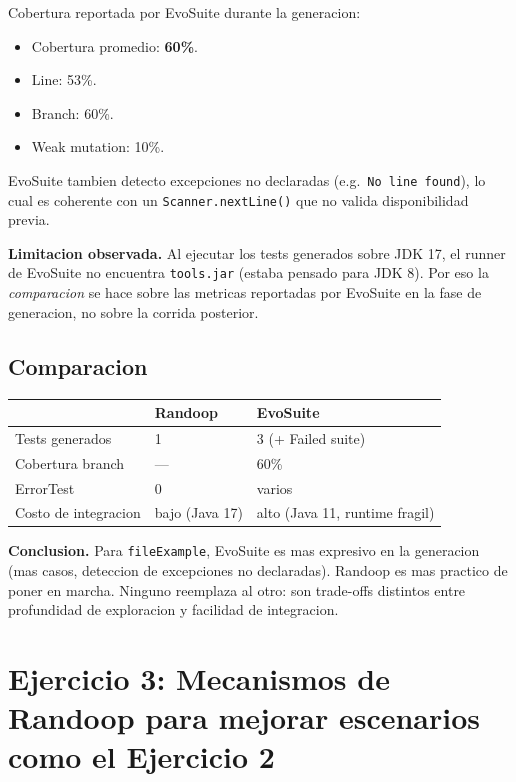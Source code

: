 \documentclass[12pt,a4paper]{article}
\begin{document}
Cobertura reportada por EvoSuite durante la generacion:

\begin{itemize}
  \item Cobertura promedio: \textbf{60\%}.
  \item Line: 53\%.
  \item Branch: 60\%.
  \item Weak mutation: 10\%.
\end{itemize}

EvoSuite tambien detecto excepciones no declaradas (e.g.\ \texttt{No line found}), lo cual
es coherente con un \texttt{Scanner.nextLine()} que no valida disponibilidad previa.

\textbf{Limitacion observada.} Al ejecutar los tests generados sobre JDK 17, el runner de
EvoSuite no encuentra \texttt{tools.jar} (estaba pensado para JDK 8). Por eso la
\emph{comparacion} se hace sobre las metricas reportadas por EvoSuite en la fase de
generacion, no sobre la corrida posterior.

\subsection{Comparacion}

\begin{center}
\begin{tabular}{lll}
\toprule
& Randoop & EvoSuite \\
\midrule
Tests generados & 1 & 3 (+ Failed suite) \\
Cobertura branch & --- & 60\% \\
ErrorTest & 0 & varios \\
Costo de integracion & bajo (Java 17) & alto (Java 11, runtime fragil) \\
\bottomrule
\end{tabular}
\end{center}

\textbf{Conclusion.} Para \texttt{fileExample}, EvoSuite es mas expresivo en la generacion
(mas casos, deteccion de excepciones no declaradas). Randoop es mas practico de poner en
marcha. Ninguno reemplaza al otro: son trade-offs distintos entre profundidad de exploracion
y facilidad de integracion.

\section{Ejercicio 3: Mecanismos de Randoop para mejorar escenarios como el Ejercicio 2}
\end{document}
